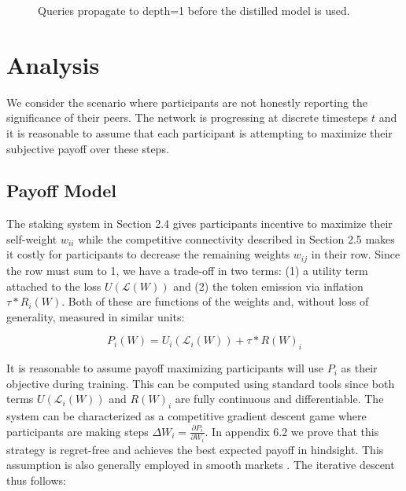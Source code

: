 \documentclass{article}
\begin{document}
\begin{figure}[H]
    \centering
    \hspace*{0cm}
    
    \caption{Queries propagate to depth=1 before the distilled model is used.}
\end{figure}{}


\section{Analysis}

We consider the scenario where participants are not honestly reporting the significance of their peers. The network is progressing at discrete timesteps $t$ and it is reasonable to assume that each participant is attempting to maximize their subjective payoff over these steps.

\subsection{Payoff Model}

The staking system in Section 2.4 gives participants incentive to maximize their self-weight $w_{ii}$ while the competitive connectivity described in Section 2.5 makes it costly for participants to decrease the remaining weights $w_{ij}$ in their row. Since the row must sum to 1, we have a trade-off in two terms: (1) a utility term attached to the loss $U(\mathcal{L}(W))$ and (2) the token emission via inflation $\tau * R_i(W)$. Both of these are functions of the weights and, without loss of generality, measured in similar units:
\bigskip

\begin{equation}
P_i (W) = U_i(\mathcal{L}_i(W)) + \tau * R(W)_i
\end{equation}
\smallskip

It is reasonable to assume payoff maximizing participants will use $P_i$ as their objective during training. This can be computed using standard tools since both terms $U(\mathcal{L}_i(W))$ and $R(W)_i$ are fully continuous and differentiable. The system can be characterized as a competitive gradient descent game where participants are making steps $\Delta W_i = \frac{\partial P_i}{\partial W_i}$. In appendix 6.2 we prove that this strategy is regret-free and achieves the best expected payoff in hindsight. This assumption is also generally employed in smooth markets \cite{balduzzi2020smooth}. The iterative descent thus follows:
\smallskip
\end{document}
